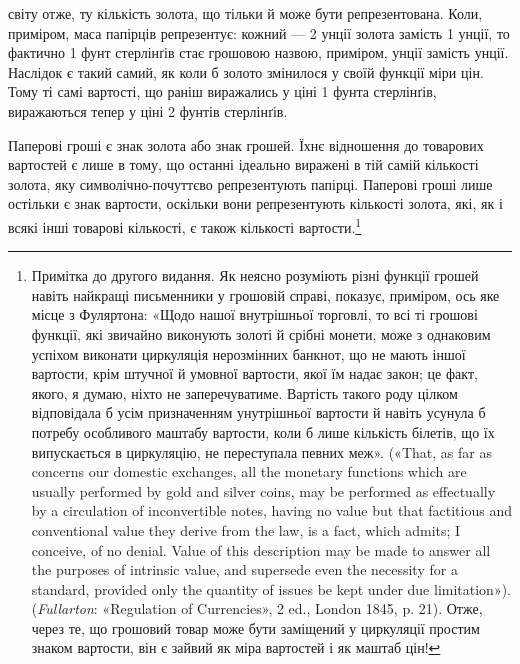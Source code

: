 \parcont{}  %
світу отже, ту кількість золота, що тільки й може бути репрезентована.
Коли, приміром, маса папірців репрезентує: кожний —
2 унції золота замість 1 унції, то фактично 1 фунт стерлінґів
стає грошовою назвою, приміром,  унції замість  унції.
Наслідок є такий самий, як коли б золото змінилося у своїй
функції міри цін. Тому ті самі вартості, що раніш виражались
у ціні 1 фунта стерлінґів, виражаються тепер у ціні 2 фунтів
стерлінґів.

Паперові гроші є знак золота або знак грошей. Їхнє відношення
до товарових вартостей є лише в тому, що останні ідеально виражені
в тій самій кількості золота, яку символічно-почуттєво
репрезентують папірці. Паперові гроші лише остільки є знак
вартости, оскільки вони репрезентують кількості золота, які,
як і всякі інші товарові кількості, є також кількості вартости.\footnote{
Примітка до другого видання. Як неясно розуміють різні функції
грошей навіть найкращі письменники у грошовій справі, показує, приміром,
ось яке місце з Фуляртона: «Щодо нашої внутрішньої торговлі, то
всі ті грошові функції, які звичайно виконують золоті й срібні монети,
може з однаковим успіхом виконати циркуляція нерозмінних банкнот,
що не мають іншої вартости, крім штучної й умовної вартости, якої їм
надає закон; це факт, якого, я думаю, ніхто не заперечуватиме. Вартість
такого роду цілком відповідала б усім призначенням унутрішньої вартости
й навіть усунула б потребу особливого маштабу вартости, коли б лише
кількість білетів, що їх випускається в циркуляцію, не переступала
певних меж». («That, as far as concerns our domestic exchanges, all the
monetary functions which are usually performed by gold and silver coins,
may be performed as effectually by a circulation of inconvertible notes,
having no value but that factitious and conventional value they derive
from the law, is a fact, which admits; I conceive, of no denial. Value of
this description may be made to answer all the purposes of intrinsic value,
and supersede even the necessity for a standard, provided only the quantity
of issues be kept under due limitation»). (\emph{Fullarton}: «Regulation of
Currencies», 2 ed., London 1845, p. 21). Отже, через те, що грошовий
товар може бути заміщений у циркуляції простим знаком вартости, він
є зайвий як міра вартостей і як маштаб цін!
}

